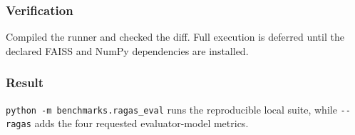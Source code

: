 \subsubsection{Verification}

Compiled the runner and checked the diff. Full execution is deferred until the declared FAISS and NumPy dependencies are installed.

\subsubsection{Result}

\texttt{python\ -m\ benchmarks.ragas\_eval} runs the reproducible local suite, while \texttt{-\/-ragas} adds the four requested evaluator-model metrics.


